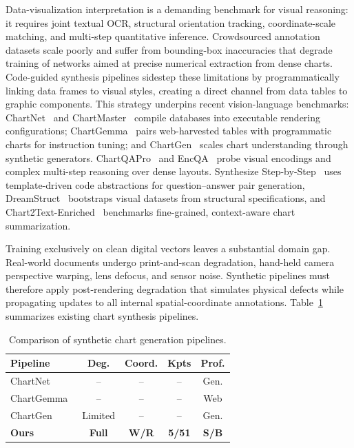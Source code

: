 \documentclass[11pt,twocolumn]{article}
\begin{document}
Data-visualization interpretation is a demanding benchmark for visual reasoning: it requires joint textual OCR, structural orientation tracking, coordinate-scale matching, and multi-step quantitative inference.
Crowdsourced annotation datasets scale poorly and suffer from bounding-box inaccuracies that degrade training of networks aimed at precise numerical extraction from dense charts.
Code-guided synthesis pipelines sidestep these limitations by programmatically linking data frames to visual styles, creating a direct channel from data tables to graphic components.
This strategy underpins recent vision-language benchmarks: ChartNet~\cite{kondic2026chartnet} and ChartMaster~\cite{liu2026chartmaster} compile databases into executable rendering configurations; ChartGemma~\cite{masry2024chartgemma} pairs web-harvested tables with programmatic charts for instruction tuning; and ChartGen~\cite{kondic2025chartgen} scales chart understanding through synthetic generators.
ChartQAPro~\cite{masry2025chartqapro} and EncQA~\cite{han2026encqa} probe visual encodings and complex multi-step reasoning over dense layouts.
Synthesize Step-by-Step~\cite{li2024synthesize} uses template-driven code abstractions for question--answer pair generation, DreamStruct~\cite{peng2024dreamstruct} bootstraps visual datasets from structural specifications, and Chart2Text-Enriched~\cite{suh2025chart2text} benchmarks fine-grained, context-aware chart summarization.

Training exclusively on clean digital vectors leaves a substantial domain gap.
Real-world documents undergo print-and-scan degradation, hand-held camera perspective warping, lens defocus, and sensor noise.
Synthetic pipelines must therefore apply post-rendering degradation that simulates physical defects while propagating updates to all internal spatial-coordinate annotations.
Table~\ref{tab:pipeline_comparison} summarizes existing chart synthesis pipelines.

\begin{table}[htbp]
\centering
\caption{Comparison of synthetic chart generation pipelines.}\label{tab:pipeline_comparison}
\scriptsize
\setlength{\tabcolsep}{3pt}
\begin{tabular}{@{} l c c c c @{}}
\toprule
\textbf{Pipeline} & \textbf{Deg.} & \textbf{Coord.} & \textbf{Kpts} & \textbf{Prof.} \\
\midrule
ChartNet~\cite{kondic2026chartnet}     & --      & --         & --         & Gen. \\
ChartGemma~\cite{masry2024chartgemma}  & --      & --         & --         & Web \\
ChartGen~\cite{kondic2025chartgen}     & Limited & --         & --         & Gen. \\
\textbf{Ours}                          & \textbf{Full} & \textbf{W/R} & \textbf{5/51} & \textbf{S/B} \\
\bottomrule
\end{tabular}
\end{table}
\end{document}
